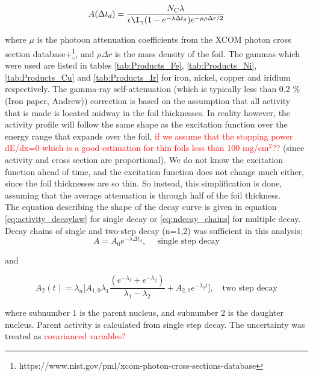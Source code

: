 \begin{equation}
    A(\Delta t_d) = \frac{N_C\lambda}{\epsilon\I_\gamma (1-e^{-\lambda \Delta t_d})e^{-\mu\rho\Delta r/2}}
\end{equation}

where $\mu$ is the photoon attenuation coefficients from the XCOM photon cross section database+\footnote{https://www.nist.gov/pml/xcom-photon-cross-sections-database}, and $\rho\Delta r$ is the mass density of the foil. The gammas which were used are listed in tables \ref{tab:Products_Fe}, \ref{tab:Products_Ni}, \ref{tab:Products_Cu} and \ref{tab:Products_Ir} for iron, nickel, copper and iridium respectively. The gamma-ray self-attenuation (which is typically less than 0.2 \% (Iron paper, Andrew)) correction is based on the assumption that all activity that is made is located midway in the foil thicknesses. In reality however, the activity profile will follow the same shape as the excitation function over the energy range that expands over the foil, \textcolor{red}{if we assume that the stopping power dE/dx=0 which is a good estimation for thin foils less than 100 mg/cm$^2$??} (since activity and cross section are proportional). We do not know the excitation function ahead of time, and the excitation function does not change much either, since the foil thicknesses are so thin. So instead, this simplification is done, assuming that the average attenuation is through half of the foil thickness. \\ 

\noindent 
The equation describing the shape of the decay curve is given in equation \ref{eq:activity_decaylaw} for single decay or \ref{eq:ndecay_chains} for multiple decay. Decay chains of single and two-step decay (n=1,2) was sufficient in this analysis; 
\begin{equation} \label{eq:onestep_activity}
    A = A_0 e^{-\lambda \Delta t_d},\quad \text{ single step decay}
\end{equation}

and

\begin{equation} \label{eq:twostep_activity}
    A_2(t) = \lambda_n \Big[ A_{1,0}\lambda_1 \frac{(e^{-\lambda_1 } + e^{-\lambda_2})}{\lambda_1 - \lambda _2} + A_{2,0}e^{-\lambda_2 t} \Big],\quad \text{two step decay}
\end{equation}

where subnumber 1 is the parent nucleus, and subnumber 2 is the daughter nucleus. Parent activity is calculated from single step decay. The uncertainty was treated as \textcolor{red}{covarianced variables?} \\

